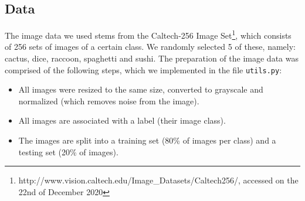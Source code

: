 \documentclass{scrartcl}
\begin{document}
\subsection{Data}
The image data we used stems from the Caltech-256 Image Set\footnote{http://www.vision.caltech.edu/Image\_Datasets/Caltech256/, accessed on the 22nd of December 2020}, which consists of 256 sets of images of a certain class. We randomly selected 5 of these, namely: cactus, dice, raccoon, spaghetti and sushi. The preparation of the image data was comprised of the following steps, which we implemented in the file \texttt{utils.py}:
\begin{itemize}
  \item All images were resized to the same size, converted to grayscale and normalized (which removes noise from the image).
  \item All images are associated with a label (their image class).
  \item The images are split into a training set (80\% of images per class) and a testing set (20\% of images).
\end{itemize}
\end{document}
